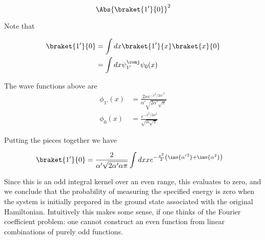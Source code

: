 {\begin{equation}\label{eqn:qmIexamPractice2008Dec:3:400}
\Abs{ \braket{1'}{0} }^2
\end{equation}

Note that

\begin{equation}\label{eqn:qmIexamPractice:790}
\begin{aligned}
\braket{1'}{0}
&=
\int dx \braket{1'}{x}\braket{x}{0} \\
&=
\int dx \psi_{1'}^\conj \psi_0(x) \\
\end{aligned}
\end{equation}

The wave functions above are
\begin{equation}\label{eqn:qmIexamPractice2008Dec:3:410}
\begin{aligned}
\phi_{1'}(x) &= \frac{ 2 x e^{-x^2/2 {\alpha'}^2 }}{ \alpha' \sqrt{ 2 \alpha' \sqrt{\pi} } } \\
\phi_{0}(x) &= \frac{ e^{-x^2/2 {\alpha}^2 } } { \sqrt{ \alpha \sqrt{\pi} } }
\end{aligned}
\end{equation}

Putting the pieces together we have

\begin{equation}\label{eqn:qmIexamPractice2008Dec:3:810}
\begin{aligned}
\braket{1'}{0}
&=
\frac{2 }{ \alpha' \sqrt{ 2 \alpha' \alpha \pi } }
\int dx
x e^{-\frac{x^2}{2}\left( \inv{{\alpha'}^2} + \inv{\alpha^2} \right) }
\end{aligned}
\end{equation}

Since this is an odd integral kernel over an even range, this evaluates to zero, and we conclude that the probability of measuring the specified energy is zero when the system is initially prepared in the ground state associated with the original Hamiltonian.  Intuitively this makes some sense, if one thinks of the Fourier coefficient problem: one cannot construct an even function from linear combinations of purely odd functions.
} %
